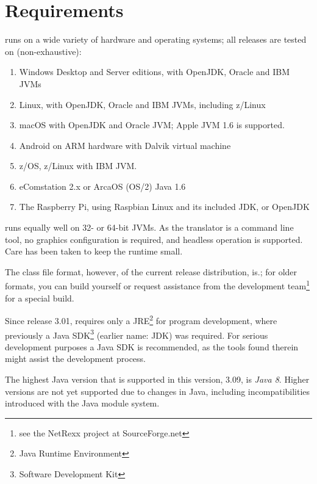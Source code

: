 \chapter{Requirements}
\nr{}  runs on a wide variety of
hardware and operating systems; all releases are tested on (non-exhaustive):
\begin{enumerate}
\item Windows Desktop and Server editions, with OpenJDK, Oracle and IBM JVMs
\item Linux, with OpenJDK, Oracle and IBM JVMs, including z/Linux
\item macOS with OpenJDK and Oracle JVM; Apple JVM 1.6 is supported.
\item Android on ARM hardware with Dalvik virtual machine
\item z/OS, z/Linux with IBM JVM.
\item eComstation 2.x or ArcaOS (OS/2) Java 1.6
\item The Raspberry Pi, using Raspbian Linux and its included JDK, or OpenJDK
\end{enumerate}
\nr{} runs equally well on 32- or 64-bit JVMs. As the translator is
a command line tool, no graphics configuration is required, and
headless operation is supported. Care has been taken to keep the \nr{} runtime small.

The class file format, however, of the current release distribution, is.; for older formats, you
can build \nr{} yourself or request assistance from the development
team\footnote{see the NetRexx project at SourceForge.net} for a special build.
\begin{shaded}\noindent
Since release 3.01, \nr{} requires only a
JRE\footnote{Java Runtime Environment} for program development, where previously a
Java SDK\footnote{Software Development Kit} (earlier name: JDK) was required. For serious development
purposes a Java SDK is recommended, as the tools found therein might
assist the development process.
\end{shaded}\indent

\begin{shaded}\noindent
The highest Java version that is supported in this version, 3.09, is
\emph{Java 8}. Higher versions are not yet supported due to changes in
Java, including incompatibilities introduced with the Java module system.
\end{shaded}\indent

